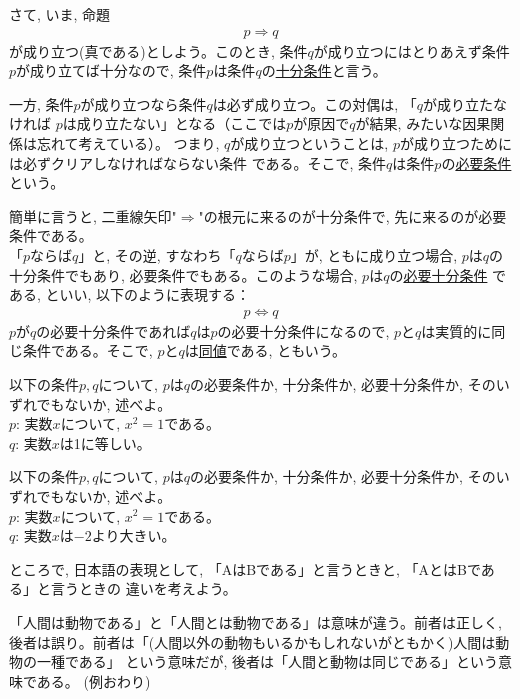 さて, いま, 命題
\begin{eqnarray}p \Longrightarrow q\end{eqnarray}
が成り立つ(真である)としよう。このとき, 条件$q$が成り立つにはとりあえず条件$p$が成り立てば十分なので, 
条件$p$は条件$q$の\underline{十分条件}と言う。

一方, 条件$p$が成り立つなら条件$q$は必ず成り立つ。この対偶は, 「$q$が成り立たなければ
$p$は成り立たない」となる（ここでは$p$が原因で$q$が結果, みたいな因果関係は忘れて考えている）。
つまり, $q$が成り立つということは, $p$が成り立つためには必ずクリアしなければならない条件
である。そこで, 条件$q$は条件$p$の\underline{必要条件}という。

簡単に言うと, 二重線矢印"$\Longrightarrow$"の根元に来るのが十分条件で, 先に来るのが必要条件である。\\

「$p$ならば$q$」と, その逆, すなわち「$q$ならば$p$」が, ともに成り立つ場合, $p$は$q$の十分条件でもあり, 
必要条件でもある。このような場合, $p$は$q$の\underline{必要十分条件}
である, といい, 以下のように表現する：
\begin{eqnarray}p \Longleftrightarrow q\end{eqnarray}
$p$が$q$の必要十分条件であれば$q$は$p$の必要十分条件になるので, $p$と$q$は実質的に同じ条件である。そこで, 
$p$と$q$は\underline{同値}である, ともいう。\\

\begin{q}\label{q:logic_hitsuyo0}
以下の条件$p, q$について, $p$は$q$の必要条件か, 十分条件か, 必要十分条件か, そのいずれでもないか, 述べよ。\\
$p$: 実数$x$について, $x^2=1$である。\\
$q$: 実数$x$は1に等しい。
\end{q}
\mv


\begin{q}\label{q:logic_hitsuyo1} 
以下の条件$p, q$について, $p$は$q$の必要条件か, 十分条件か, 必要十分条件か, そのいずれでもないか, 述べよ。\\
$p$: 実数$x$について, $x^2=1$である。\\
$q$: 実数$x$は$-2$より大きい。
\end{q}
\mv

ところで, 日本語の表現として, 「AはBである」と言うときと, 「AとはBである」と言うときの
違いを考えよう。
\begin{exmpl}\label{ex:to_toha}
「人間は動物である」と「人間とは動物である」は意味が違う。前者は正しく, 
後者は誤り。前者は「(人間以外の動物もいるかもしれないがともかく)人間は動物の一種である」
という意味だが, 後者は「人間と動物は同じである」という意味である。
(例おわり)\end{exmpl}
\mv


